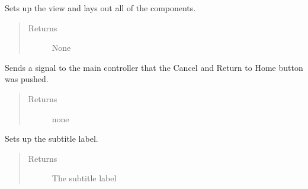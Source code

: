 \documentclass[letterpaper,10pt,english]{sphinxmanual}
\begin{document}
\begin{fulllineitems}
\begin{fulllineitems}
\label{\detokenize{index:src.Views.View_LoadingScreen.LoadingWindow.initView}}
Sets up the view and lays out all of the components.
\begin{quote}\begin{description}
\item[{Returns}] \leavevmode
None

\end{description}\end{quote}

\end{fulllineitems}


\begin{fulllineitems}
\label{\detokenize{index:src.Views.View_LoadingScreen.LoadingWindow.returnHome}}
Sends a signal to the main controller that the Cancel and Return to Home button was pushed.
\begin{quote}\begin{description}
\item[{Returns}] \leavevmode
none

\end{description}\end{quote}

\end{fulllineitems}


\begin{fulllineitems}
\label{\detokenize{index:src.Views.View_LoadingScreen.LoadingWindow.setSubtitle}}
Sets up the subtitle label.
\begin{quote}\begin{description}
\item[{Returns}] \leavevmode
The subtitle label

\end{description}\end{quote}


\end{fulllineitems}
\end{fulllineitems}
\end{document}
